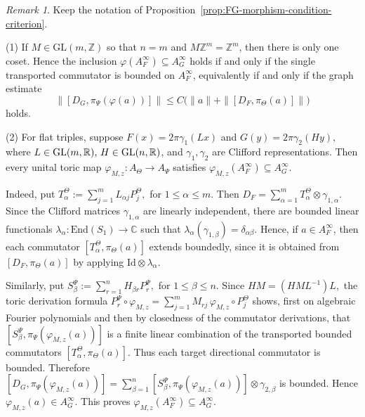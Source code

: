 \documentclass[11pt]{amsart}
\theoremstyle{definition}
\theoremstyle{remark}
\newtheorem{remark}[theorem]{Remark}
\newcommand{\Z}{\mathbb{Z}}
\newcommand{\R}{\mathbb{R}}
\newcommand{\C}{\mathbb C}
\newcommand{\GL}{\mathrm{GL}}
\newcommand{\id}{\mathrm{Id}}
\newcommand{\End}{\mathrm{End}}
\begin{document}
\begin{remark}%
\label{cor:FG-condition-easy-cases}
Keep the notation of Proposition~\ref{prop:FG-morphism-condition-criterion}.
\smallskip

\noindent
 
\textup{(1)} If $M\in\GL(m,\Z)$
so that $n=m$ and $M\Z^m=\Z^m$, then there is only one coset. Hence the inclusion $\varphi(A_F^\infty)\subseteq A_G^\infty$
holds if and only if the single transported commutator is bounded on
$A_F^\infty$, equivalently if and only if the graph estimate
\[
\|[D_G,\pi_\Psi(\varphi(a))]\|
\leq
C\bigl(\|a\|+\|[D_F,\pi_\Theta(a)]\|\bigr)
\]
holds.
\smallskip

\noindent
 
\textup{(2)} For flat triples, suppose $F(x)=2\pi\gamma_1(Lx)$ and $G(y)=2\pi\gamma_2(Hy),$
where $L\in\GL(m,\R)\), \(H\in\GL(n,\R)$, and
$\gamma_1,\gamma_2$ are Clifford representations. Then every unital toric
map $\varphi_{M,z}\colon A_\Theta\to A_\Psi$
satisfies $\varphi_{M,z}(A_F^\infty)\subseteq A_G^\infty.$

Indeed, put $T_\alpha^\Theta:=\sum_{j=1}^m L_{\alpha j}P_j^\Theta,$ for
$1\leq \alpha\leq m.$
Then $D_F=\sum_{\alpha=1}^m T_\alpha^\Theta\otimes\gamma_{1,\alpha}.$
Since the Clifford matrices $\gamma_{1,\alpha}$ are linearly independent,
there are bounded linear functionals $\lambda_\alpha\colon \End(S_1)\to\C$
such that $\lambda_\alpha(\gamma_{1,\beta})=\delta_{\alpha\beta}.$
Hence, if $a\in A_F^\infty$, then each commutator $[T_\alpha^\Theta,\pi_\Theta(a)]$
extends boundedly, since it is obtained from $[D_F,\pi_\Theta(a)]$
by applying $\id\otimes\lambda_\alpha$.

Similarly, put $S_\beta^\Psi:=\sum_{r=1}^n H_{\beta r}P_r^\Psi,$ for 
$1\leq \beta\leq n.$
Since $HM=(HML^{-1})L,$
the toric derivation formula $P_r^\Psi\circ\varphi_{M,z}=\sum_{j=1}^m M_{rj}\,\varphi_{M,z}\circ P_j^\Theta$
shows, first on algebraic Fourier polynomials and then by closedness of the
commutator derivations, that $[S_\beta^\Psi,\pi_\Psi(\varphi_{M,z}(a))]$
is a finite linear combination of the transported bounded commutators $[T_\alpha^\Theta,\pi_\Theta(a)].$
Thus each target directional commutator is bounded. Therefore $[D_G,\pi_\Psi(\varphi_{M,z}(a))]
=\sum_{\beta=1}^n[S_\beta^\Psi,\pi_\Psi(\varphi_{M,z}(a))]\otimes\gamma_{2,\beta}$
is bounded. Hence $\varphi_{M,z}(a)\in A_G^\infty.$
This proves $\varphi_{M,z}(A_F^\infty)\subseteq A_G^\infty.$
 \end{remark}
\end{document}
